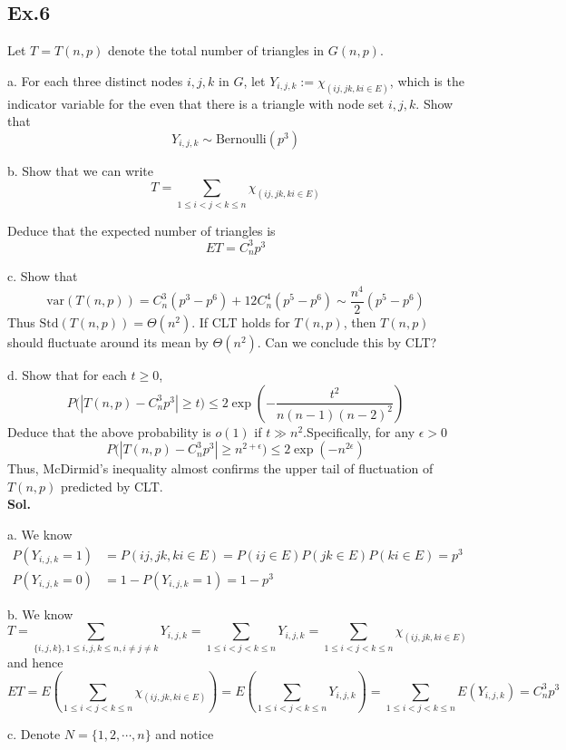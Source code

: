 \documentclass[lang=en,11pt,a4paper,citestyle =authoryear]{elegantpaper}
\begin{document}
\subsection*{Ex.6} 
Let $T = T (n, p)$ denote the total number of triangles in $G(n, p)$.\par
a. For each three distinct nodes $i , j , k$ in $G$, let $Y_{i,j,k} := \chi_{(i j , jk, ki \in E )}$, which is the indicator variable for the even that there is a triangle with node set ${i , j , k}$. Show that
\[Y_{i,j,k} \sim \text{Bernoulli}(p^3)\]\par
b. Show that we can write
\[T = \sum\limits_{1\leq i < j < k \leq n}\chi_{(i j , jk, ki \in E )}\]\par
Deduce that the expected number of triangles is
\[ET = C_n^3 p^3\]\par
c. Show that
\[\text{var}(T(n,p)) = C_n^3(p^3-p^6) + 12 C_n^4(p^5-p^6) \sim \dfrac{n^4}{2}(p^5-p^6)\]
Thus $\text{Std}(T (n, p)) = \Theta(n^2)$. If CLT holds for $T (n, p)$, then $T (n, p)$ should fluctuate around its mean by $\Theta(n^2)$. Can we
conclude this by CLT?\par
d. Show that for each $t \geq 0$,
\[P\Big(|T(n,p)-C_n^3p^3|\geq t\Big) \leq 2\exp(-\dfrac{t^2}{n(n-1)(n-2)^2})\]
Deduce that the above probability is $o(1)$ if $t\gg n^2$.Specifically, for any $\epsilon > 0$
\[
P\Big(|T(n,p)-C_n^3p^3|\geq n^{2+\epsilon}\Big) \leq 2\exp(-n^{2\epsilon})
\]
Thus, McDirmid's inequality almost confirms the upper tail of fluctuation of $T (n, p)$ predicted by CLT.
\vspace{0.5em}\\
\textbf{Sol.} \par
a. We know
\[
\begin{aligned}
    P(Y_{i,j,k} = 1) &= P(ij,jk,ki\in E) = P(ij\in E)P(jk\in E)P(ki\in E) = p^3 \\
    P(Y_{i,j,k} = 0) &= 1 - P(Y_{i,j,k} = 1) = 1-p^3
\end{aligned}
\]\par
b. We know
\[
T = \sum\limits_{\{i,j,k\}, 1\leq i,j,k\leq n, i\neq j \neq k} Y_{i,j,k} = \sum\limits_{1\leq i < j < k \leq n} Y_{i,j,k} = \sum\limits_{1\leq i < j < k \leq n}\chi_{(i j , jk, ki \in E )}
\]
and hence
\[
ET = E(\sum\limits_{1\leq i < j < k \leq n}\chi_{(i j , jk, ki \in E )}) = E(\sum\limits_{1\leq i < j < k \leq n}Y_{i,j,k}) = \sum\limits_{1\leq i < j < k \leq n}E(Y_{i,j,k}) = C_n^3 p^3
\]\par
c. Denote $N = \{1,2,\cdots, n\}$ and notice
\end{document}
